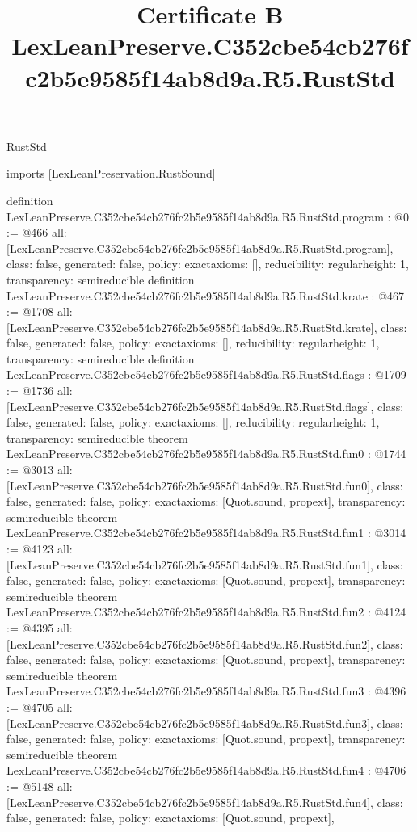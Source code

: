 \begin{lexlean}{RustStd}
\title{Certificate B LexLeanPreserve.C352cbe54cb276fc2b5e9585f14ab8d9a.R5.RustStd}
\begin{coremodule}
imports [LexLeanPreservation.RustSound]

definition LexLeanPreserve.C352cbe54cb276fc2b5e9585f14ab8d9a.R5.RustStd.program : @0 := @466 {
  all: [LexLeanPreserve.C352cbe54cb276fc2b5e9585f14ab8d9a.R5.RustStd.program],
  class: false,
  generated: false,
  policy: exact{axioms: []},
  reducibility: regular{height: 1},
  transparency: semireducible
}
definition LexLeanPreserve.C352cbe54cb276fc2b5e9585f14ab8d9a.R5.RustStd.krate : @467 := @1708 {
  all: [LexLeanPreserve.C352cbe54cb276fc2b5e9585f14ab8d9a.R5.RustStd.krate],
  class: false,
  generated: false,
  policy: exact{axioms: []},
  reducibility: regular{height: 1},
  transparency: semireducible
}
definition LexLeanPreserve.C352cbe54cb276fc2b5e9585f14ab8d9a.R5.RustStd.flags : @1709 := @1736 {
  all: [LexLeanPreserve.C352cbe54cb276fc2b5e9585f14ab8d9a.R5.RustStd.flags],
  class: false,
  generated: false,
  policy: exact{axioms: []},
  reducibility: regular{height: 1},
  transparency: semireducible
}
theorem LexLeanPreserve.C352cbe54cb276fc2b5e9585f14ab8d9a.R5.RustStd.fun0 : @1744 := @3013 {
  all: [LexLeanPreserve.C352cbe54cb276fc2b5e9585f14ab8d9a.R5.RustStd.fun0],
  class: false,
  generated: false,
  policy: exact{axioms: [Quot.sound, propext]},
  transparency: semireducible
}
theorem LexLeanPreserve.C352cbe54cb276fc2b5e9585f14ab8d9a.R5.RustStd.fun1 : @3014 := @4123 {
  all: [LexLeanPreserve.C352cbe54cb276fc2b5e9585f14ab8d9a.R5.RustStd.fun1],
  class: false,
  generated: false,
  policy: exact{axioms: [Quot.sound, propext]},
  transparency: semireducible
}
theorem LexLeanPreserve.C352cbe54cb276fc2b5e9585f14ab8d9a.R5.RustStd.fun2 : @4124 := @4395 {
  all: [LexLeanPreserve.C352cbe54cb276fc2b5e9585f14ab8d9a.R5.RustStd.fun2],
  class: false,
  generated: false,
  policy: exact{axioms: [Quot.sound, propext]},
  transparency: semireducible
}
theorem LexLeanPreserve.C352cbe54cb276fc2b5e9585f14ab8d9a.R5.RustStd.fun3 : @4396 := @4705 {
  all: [LexLeanPreserve.C352cbe54cb276fc2b5e9585f14ab8d9a.R5.RustStd.fun3],
  class: false,
  generated: false,
  policy: exact{axioms: [Quot.sound, propext]},
  transparency: semireducible
}
theorem LexLeanPreserve.C352cbe54cb276fc2b5e9585f14ab8d9a.R5.RustStd.fun4 : @4706 := @5148 {
  all: [LexLeanPreserve.C352cbe54cb276fc2b5e9585f14ab8d9a.R5.RustStd.fun4],
  class: false,
  generated: false,
  policy: exact{axioms: [Quot.sound, propext]},
}
\end{coremodule}
\end{lexlean}
